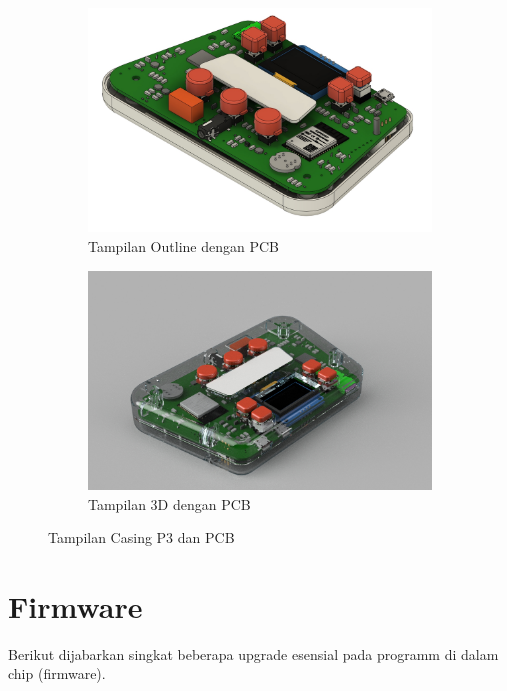 \documentclass{book} %
\begin{document}
	\begin{figure}[!ht]
		\centering
		\begin{subfigure}[t]{0.45\textwidth}
			\includegraphics[width=\textwidth]{images/p3_casing_pcb}
			\caption{Tampilan Outline dengan PCB}
		\end{subfigure}
		\begin{subfigure}[t]{0.45\textwidth}
			\includegraphics[width=\textwidth]{images/p3_casing_trans}
			\caption{Tampilan 3D dengan PCB}
		\end{subfigure}
		\caption{Tampilan Casing P3 dan PCB}
	\end{figure}
    
    \chapter{Firmware}
    
    Berikut dijabarkan singkat beberapa upgrade esensial pada programm di dalam chip (firmware).
    
\end{document}
